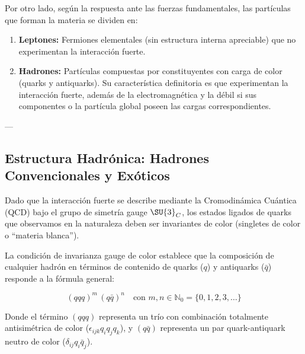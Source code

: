 Por otro lado, según la respuesta ante las fuerzas fundamentales, las partículas que forman la materia se dividen en:
\begin{enumerate}[label=\alph*)]
    \item \textbf{Leptones:} Fermiones elementales (sin estructura interna apreciable) que no experimentan la interacción fuerte.
    \item \textbf{Hadrones:} Partículas compuestas por constituyentes con carga de color (quarks y antiquarks). Su característica definitoria es que experimentan la interacción fuerte, además de la electromagnética y la débil si sus componentes o la partícula global poseen las cargas correspondientes.
\end{enumerate}

---

\subsection{Estructura Hadrónica: Hadrones Convencionales y Exóticos}

Dado que la interacción fuerte se describe mediante la Cromodinámica Cuántica (QCD) bajo el grupo de simetría gauge $\SU{3}_C$, los estados ligados de quarks que observamos en la naturaleza deben ser invariantes de color (singletes de color o ``materia blanca''). 

La condición de invarianza gauge de color establece que la composición de cualquier hadrón en términos de contenido de quarks ($q$) y antiquarks ($\bar{q}$) responde a la fórmula general:

\begin{equation}
\label{eq:hadron_formula}
(q q q)^m \, (q \bar{q})^n \quad \text{con } m, n \in \mathbb{N}_0 = \{0, 1, 2, 3, \dots\}
\end{equation}

Donde el término $(qqq)$ representa un trío con combinación totalmente antisimétrica de color ($\epsilon_{ijk} q_i q_j q_k$), y $(q\bar{q})$ representa un par quark-antiquark neutro de color ($\delta_{ij} q_i \bar{q}_j$).

